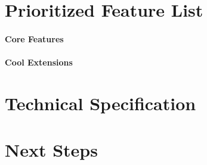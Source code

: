 \documentclass{article}
\begin{document}
\section{Prioritized Feature List}
\paragraph{Core Features}
\paragraph{Cool Extensions}

\section{Technical Specification}
\section{Next Steps}
\end{document}
